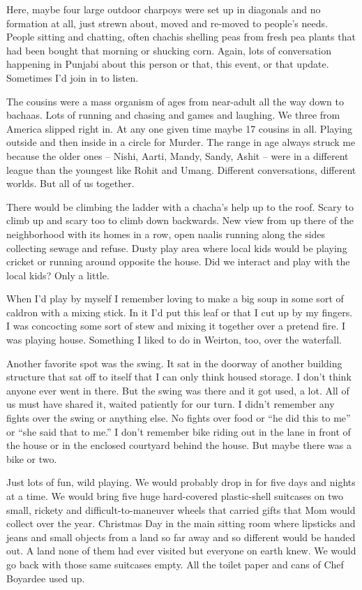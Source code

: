 Here, maybe four large outdoor charpoys were set up in diagonals and no formation at all, just strewn about, moved and re-moved to people’s needs. People sitting and chatting, often chachis shelling peas from fresh pea plants that had been bought that morning or shucking corn. Again, lots of conversation happening in Punjabi about this person or that, this event, or that update. Sometimes I’d join in to listen.

The cousins were a mass organism of ages from near-adult all the way down to bachaas. Lots of running and chasing and games and laughing. We three from America slipped right in. At any one given time maybe 17 cousins in all. Playing outside and then inside in a circle for Murder. The range in age always struck me because the older ones – Nishi, Aarti, Mandy, Sandy, Ashit – were in a different league than the youngest like Rohit and Umang. Different conversations, different worlds. But all of us together.

There would be climbing the ladder with a chacha’s help up to the roof. Scary to climb up and scary too to climb down backwards. New view from up there of the neighborhood with its homes in a row, open naalis running along the sides collecting sewage and refuse. Dusty play area where local kids would be playing cricket or running around opposite the house. Did we interact and play with the local kids? Only a little.

When I’d play by myself I remember loving to make a big soup in some sort of caldron with a mixing stick. In it I’d put this leaf or that I cut up by my fingers. I was concocting some sort of stew and mixing it together over a pretend fire. I was playing house. Something I liked to do in Weirton, too, over the waterfall.

Another favorite spot was the swing. It sat in the doorway of another building structure that sat off to itself that I can only think housed storage. I don’t think anyone ever went in there. But the swing was there and it got used, a lot. All of us must have shared it, waited patiently for our turn. I didn’t remember any fights over the swing or anything else. No fights over food or “he did this to me” or “she said that to me.” I don’t remember bike riding out in the lane in front of the house or in the enclosed courtyard behind the house. But maybe there was a bike or two.

Just lots of fun, wild playing. We would probably drop in for five days and nights at a time. We would bring five huge hard-covered plastic-shell suitcases on two small, rickety and difficult-to-maneuver wheels that carried gifts that Mom would collect over the year. Christmas Day in the main sitting room where lipsticks and jeans and small objects from a land so far away and so different would be handed out. A land none of them had ever visited but everyone on earth knew. We would go back with those same suitcases empty. All the toilet paper and cans of Chef Boyardee used up.

